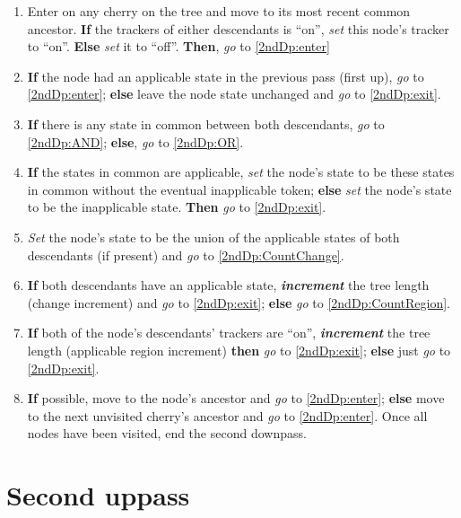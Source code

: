 \documentclass[a4paper,12pt]{article}
\begin{document}
\begin{enumerate}

    \item \label{2ndDp:entry} Enter on any cherry on the tree and move to its most recent common ancestor. \textbf{If} the trackers of either descendants is ``on'', \textit{set} this node's tracker to ``on''. \textbf{Else} \textit{set} it to ``off''. \textbf{Then}, \textit{go} to \ref{2ndDp:enter}
    \item \label{2ndDp:nodeAppli} \textbf{If} the node had an applicable state in the previous pass (first up), \textit{go} to \ref{2ndDp:enter}; \textbf{else} leave the node state unchanged and \textit{go} to \ref{2ndDp:exit}.
    \item \label{2ndDp:enter} \textbf{If} there is any state in common between both descendants, \textit{go} to \ref{2ndDp:AND}; \textbf{else}, \textit{go} to \ref{2ndDp:OR}.
    \item \label{2ndDp:AND} \textbf{If} the states in common are applicable, \textit{set} the node's state to be these states in common without the eventual inapplicable token; \textbf{else} \textit{set} the node's state to be the inapplicable state. \textbf{Then} \textit{go} to \ref{2ndDp:exit}. 
    \item \label{2ndDp:OR} \textit{Set} the node's state to be the union of the applicable states of both descendants (if present) and \textit{go} to \ref{2ndDp:CountChange}.
    \item \label{2ndDp:CountChange} \textbf{If} both descendants have an applicable state, \textbf{\textit{increment}} the tree length (change increment) and \textit{go} to \ref{2ndDp:exit}; \textbf{else} \textit{go} to \ref{2ndDp:CountRegion}.
    \item \label{2ndDp:CountRegion} \textbf{If} both of the node's descendants' trackers are ``on'', \textbf{\textit{increment}} the tree length (applicable region increment) \textbf{then} \textit{go} to \ref{2ndDp:exit}; \textbf{else} just \textit{go} to \ref{2ndDp:exit}.
    \item \label{2ndDp:exit} \textbf{If} possible, move to the node's ancestor and \textit{go} to \ref{2ndDp:enter}; \textbf{else} move to the next unvisited cherry's ancestor and \textit{go} to \ref{2ndDp:enter}. Once all nodes have been visited, end the second downpass.
\end{enumerate}

\section{Second uppass} \label{2ndUp}
\end{document}
